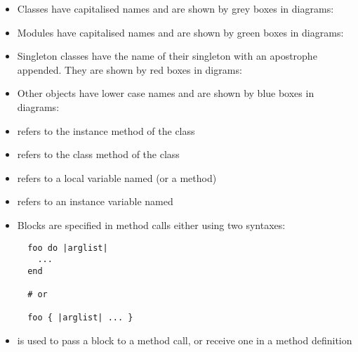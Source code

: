 \begin{itemize}
  \item Classes have capitalised names and are shown by grey boxes in diagrams: \\
  
  \item Modules have capitalised names and are shown by green boxes in diagrams: \\
  
  \item Singleton classes have the name of their singleton with an apostrophe appended. They are shown by red boxes in digrams: \\
  
  \item Other objects have lower case names and are shown by blue boxes in diagrams: \\
  
  \item {} refers to the instance method  of the class 
  
  \item {} refers to the class method  of the class 
  
  \item {} refers to a local variable named  (or a method)
  
  \item {} refers to an instance variable named 
  
  \item Blocks are specified in method calls either using two syntaxes:
  \begin{lstlisting}
  foo do |arglist|
    ...
  end
  
  # or
  
  foo { |arglist| ... }
  \end{lstlisting}
  
  \item {} is used to pass a block to a method call, or receive one in a method definition
\end{itemize}
